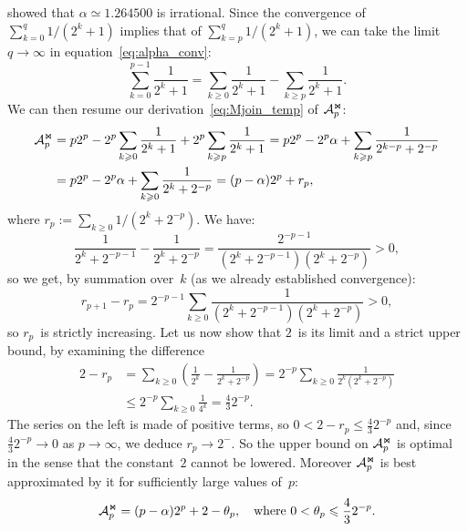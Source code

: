 \cite{Borwein_1992} showed that \(\alpha \simeq 1.264500\) is irrational. Since
the convergence of \(\sum_{k=0}^q{1/(2^k+1)}\) implies that of
\(\sum_{k=p}^q{1/(2^k+1)}\), we can take the limit \(q \rightarrow \infty\) in
equation~\eqref{eq:alpha_conv}:
\begin{equation*}
  \sum_{k=0}^{p-1}\frac{1}{2^k+1} = \sum_{k \geqslant 0}\frac{1}{2^k+1} -
  \sum_{k \geqslant p}\frac{1}{2^k+1}.
\end{equation*}
We can then resume our derivation~\eqref{eq:Mjoin_temp} of \(\mathcal{A}_{p}^{\Join}\):
\begin{align}
 \mathcal{A}_{p}^{\Join}
  &= p2^p - 2^p \sum_{k \geqslant 0}\frac{1}{2^k+1}
   + 2^p \sum_{k \geqslant p}\frac{1}{2^k+1}= p2^p - 2^p \alpha + \sum_{k \geqslant p}\frac{1}{2^{k-p}+2^{-p}}\notag\\
  &= p2^p - 2^p \alpha + \sum_{k \geqslant 0}\frac{1}{2^k+2^{-p}}
   = (p - \alpha) 2^p + r_p,
\label{eq:Mjoin}
\end{align}
where \(r_p := \sum_{k \geqslant 0}1/(2^{k}+2^{-p})\). We have:
\begin{equation*}
  \frac{1}{2^k + 2^{-p-1}} - \frac{1}{2^k + 2^{-p}}
  = \frac{2^{-p-1}}{(2^k + 2^{-p-1})(2^k + 2^{-p})} > 0,
\end{equation*}
so we get, by summation over~\(k\) (as we already established convergence):
\begin{equation*}
  r_{p+1} - r_p = 2^{-p-1}\sum_{k \geqslant 0}\frac{1}{(2^k + 2^{-p-1})(2^k +
    2^{-p})} > 0,
\end{equation*}
so \(r_p\)~is strictly increasing. Let us now show that \(2\)~is its limit
and a strict upper bound, by examining the difference
\begin{align*}
  2 - r_p
  &= \sum_{k \geqslant 0}\left(\frac{1}{2^k} - \frac{1}{2^k + 2^{-p}}\right)
  = 2^{-p}\sum_{k \geqslant 0}\frac{1}{2^k(2^k + 2^{-p})}\\
  &\leqslant 2^{-p}\sum_{k \geqslant 0}\frac{1}{4^k}
  = \frac{4}{3}2^{-p}.
\end{align*}
The series on the left is made of positive terms, so \(0 < 2 - r_p \leqslant
\tfrac{4}{3}2^{-p}\) and, since \(\tfrac{4}{3}2^{-p} \rightarrow 0\) as \(p \to
\infty\), we deduce \(r_p \rightarrow 2^{-}\). So the upper bound on
\(\mathcal{A}_{p}^{\Join}\) is optimal in the sense that the constant~\(2\) cannot be
lowered. Moreover \(\mathcal{A}_{p}^{\Join}\) is best approximated by it for sufficiently
large values of~\(p\):
\begin{equation*}
  \mathcal{A}_{p}^{\Join} = (p - \alpha) 2^p + 2 - \theta_p,
  \quad \text{where \(0 < \theta_p \leqslant \frac{4}{3}2^{-p}\)}.
\end{equation*}

